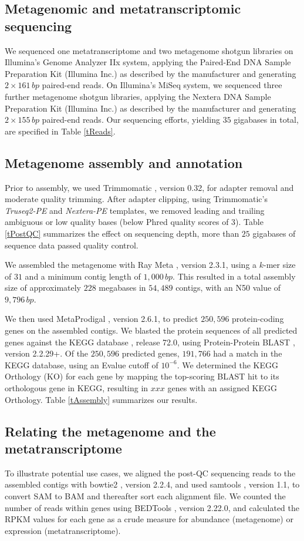 \documentclass{bmcart}
\begin{document}
\subsection*{Metagenomic and metatranscriptomic sequencing}
We sequenced one metatranscriptome and two metagenome shotgun libraries on Illumina's Genome Analyzer IIx system, applying the Paired-End DNA Sample Preparation Kit (Illumina Inc.) as described by the manufacturer and generating $2 \times 161\,bp$ paired-end reads.
On Illumina's MiSeq system, we sequenced three further metagenome shotgun libraries, applying the Nextera DNA Sample Preparation Kit (Illumina Inc.) as described by the manufacturer and generating $2 \times 155\,bp$ paired-end reads.
Our sequencing efforts, yielding $35$ gigabases in total, are specified in Table \ref{tReads}.

\subsection*{Metagenome assembly and annotation}
Prior to assembly, we used Trimmomatic \cite{Trimmomatic}, version 0.32, for adapter removal and moderate quality trimming.
After adapter clipping, using Trimmomatic's \emph{Truseq2-PE} and \emph{Nextera-PE} templates, we removed leading and trailing ambiguous or low quality bases (below Phred quality scores of 3).
Table \ref{tPostQC} summarizes the effect on sequencing depth, more than $25$ gigabases of sequence data passed quality control.

We assembled the metagenome with Ray Meta \cite{RayMeta}, version 2.3.1, using a $k$-mer size of $31$ and a minimum contig length of $1,000\,bp$.
This resulted in a total assembly size of approximately $228$ megabases in $54,489$ contigs, with an N50 value of $9,796\,bp$. %

We then used MetaProdigal \cite{MetaProdigal}, version 2.6.1, to predict $250,596$ protein-coding genes on the assembled contigs. We blasted the protein sequences of all predicted genes against the KEGG database \cite{KeggDB}, release 72.0, using Protein-Protein BLAST \cite{BlastPlus}, version 2.2.29+. 
Of the $250,596$ predicted genes, $191,766$ had a match in the KEGG database, using an Evalue cutoff of $10^{-6}$.
We determined the KEGG Orthology (KO) for each gene by mapping the top-scoring BLAST hit to its orthologous gene in KEGG, resulting in $xxx$ genes with an assigned KEGG Orthology.
Table \ref{tAssembly} summarizes our results.

\subsection*{Relating the metagenome and the metatranscriptome}
To illustrate potential use cases, we aligned the post-QC sequencing reads to the assembled contigs with bowtie2 \cite{Bowtie2}, version 2.2.4, and used samtools \cite{Samtools}, version 1.1, to convert SAM to BAM and thereafter sort each alignment file. We counted the number of reads within genes using BEDTools \cite{BEDTools}, version 2.22.0, and calculated the RPKM values for each gene as a crude measure for abundance (metagenome) or expression (metatranscriptome).
\end{document}

